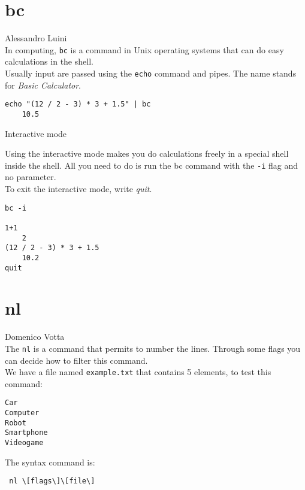 \documentclass[hidelinks,12pt,a4paper,numbers=enddot]{scrartcl}
\begin{document}
\section{bc}


\large Alessandro Luini \normalsize\\



In computing, \texttt{bc} is a command in Unix operating systems that can do easy
calculations in the shell.\\
Usually input are passed using the \texttt{echo} command and pipes.
The name stands for \emph{Basic Calculator}.\\

\begin{verbatim}
echo "(12 / 2 - 3) * 3 + 1.5" | bc
    10.5
\end{verbatim}

Interactive mode

Using the interactive mode makes you do calculations freely in a special shell inside the shell.
All you need to do is run the bc command with the \texttt{-i} flag
and no parameter.\\
To exit the interactive mode, write \emph{quit}.

\begin{verbatim}
bc -i

1+1
    2
(12 / 2 - 3) * 3 + 1.5
    10.2
quit
\end{verbatim}

\section{nl}


\large Domenico Votta \normalsize\\


The \texttt{nl} is a command that permits to number the lines.
Through some flags you can decide how to filter this command.\\

We have a file named \texttt{example.txt} that contains 5 elements, to test this command:

\begin{verbatim}
Car
Computer
Robot
Smartphone
Videogame
\end{verbatim}

The syntax command is:
\begin{verbatim} nl \[flags\]\[file\] \end{verbatim}
\end{document}
